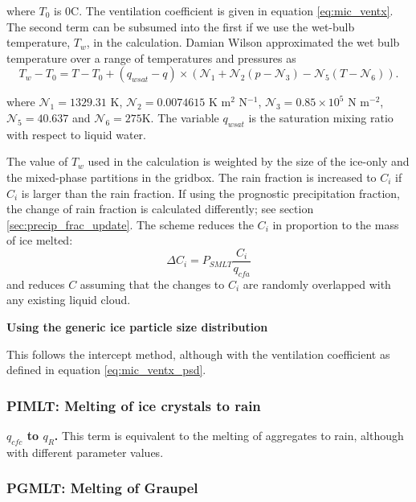 \documentclass{UMDP_article}
\def\bq{\begin{equation}}
\def\eq{\end{equation}}
\begin{document}
where $T_0$ is 0\textdegree C. The ventilation coefficient is given in equation
\ref{eq:mic_ventx}. The second term can be subsumed into the first
if we use the wet-bulb temperature, $T_w$, in the calculation. Damian Wilson 
approximated the wet bulb temperature over a range of temperatures and pressures 
as
\begin{equation}
T_w-T_0 = T - T_0 + \left( q_{wsat} - q \right) \times
\left(\mathcal{N}_1 + \mathcal{N}_2 (p - \mathcal{N}_3)
 - \mathcal{N}_5 (T - \mathcal{N}_6) \right) .
\end{equation}

where $\mathcal{N}_1= 1329.31$ K, $\mathcal{N}_2=0.0074615$ K m$^2$ N$^{-1}$,
$\mathcal{N}_3= 0.85 \times 10^5 $ N m$^{-2}$, $\mathcal{N}_5= 40.637 $ and
$\mathcal{N}_6=275$K. The variable $q_{wsat}$ is the saturation mixing ratio
with respect to liquid water.

The value of $T_w$ used in the calculation is
weighted by the size of the ice-only and the mixed-phase partitions in the gridbox.
The rain fraction is increased to $C_i$ if $C_i$ is larger
than the rain fraction.
If using the prognostic precipitation fraction, the change of rain fraction
is calculated differently; see section \ref{sec:precip_frac_update}.
The scheme reduces the $C_i$ in proportion to the
mass of ice melted:
\bq
\Delta C_i = P_{SMLT} \frac{C_i}{q_{cfa}}
\eq
and reduces $C$ assuming that the changes to $C_i$ are randomly overlapped with
any existing liquid cloud.

\textbf{Using the generic ice particle size distribution}

This follows the intercept method, although with the ventilation coefficient
as defined in equation \ref{eq:mic_ventx_psd}.


\subsubsection{PIMLT:  Melting of ice crystals to rain}

\textbf{$q_{cfc}$ to $q_{R}$.} 
This term is equivalent to the melting of aggregates to rain,
although with different parameter values.

\subsubsection{PGMLT:  Melting of Graupel}
\label{sec:PGMLT}
\end{document}
